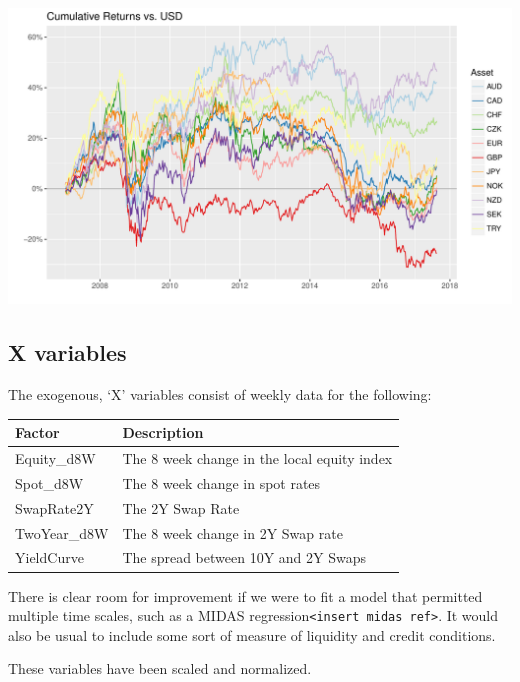 \documentclass[]{article}
\begin{document}
\includegraphics{Econometric_FX_Forecasting_files/figure-latex/graph_endos-1.pdf}

\subsection{X variables}\label{x-variables}

The exogenous, `X' variables consist of weekly data for the following:

\begin{longtable}[]{@{}ll@{}}
\toprule
Factor & Description\tabularnewline
\midrule
\endhead
Equity\_d8W & The 8 week change in the local equity index\tabularnewline
Spot\_d8W & The 8 week change in spot rates\tabularnewline
SwapRate2Y & The 2Y Swap Rate\tabularnewline
TwoYear\_d8W & The 8 week change in 2Y Swap rate\tabularnewline
YieldCurve & The spread between 10Y and 2Y Swaps\tabularnewline
\bottomrule
\end{longtable}

There is clear room for improvement if we were to fit a model that
permitted multiple time scales, such as a MIDAS
regression\texttt{\textless{}insert\ midas\ ref\textgreater{}}. It would
also be usual to include some sort of measure of liquidity and credit
conditions.

These variables have been scaled and normalized.
\end{document}
